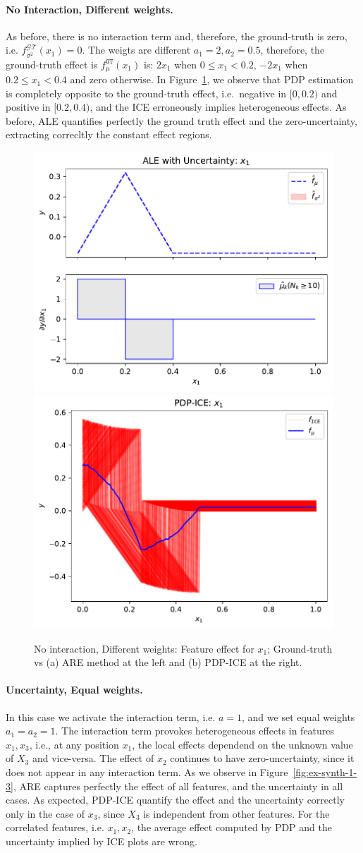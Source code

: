 \documentclass[twoside]{article}
\begin{document}
\paragraph{No Interaction, Different weights.}

As before, there is no interaction term and, therefore, the
ground-truth is zero, i.e.  \(f^{\mathcal{GT}}_{\sigma^2}(x_1) =
0\). The weigts are different \(a_1=2, a_2=0.5\), therefore, the
ground-truth effect is \(f_\mu^{\mathtt{GT}}(x_1)\) is: \(2x_1\) when
\(0 \leq x_1 < 0.2\), \(-2x_1\) when \(0.2 \leq x_1 < 0.4\) and zero
otherwise. In Figure~\ref{fig:ex-synth-1-2}, we observe that PDP
estimation is completely opposite to the ground-truth effect,
i.e.~negative in \([0, 0.2)\) and positive in \([0.2, 0.4)\), and the
ICE erroneously implies heterogeneous effects.  As before, ALE
quantifies perfectly the ground truth effect and the zero-uncertainty,
extracting correcltly the constant effect regions.

\begin{figure}[h]
  \centering
  \includegraphics[width=.23\textwidth]{example_2/dale_feat_0.pdf}
  \includegraphics[width=.23\textwidth]{example_2/pdp_ice_feat_0.pdf}
  \caption{No interaction, Different weights: Feature effect for \(x_1\);
    Ground-truth vs (a) ARE method at the left and (b) PDP-ICE at the
    right.}
  \label{fig:ex-synth-1-2}
\end{figure}

\paragraph{Uncertainty, Equal weights.}

In this case we activate the interaction term, i.e. \(a=1\), and we
set equal weights \(a_1=a_2=1\). The interaction term provokes
heterogeneous effects in features \(x_1, x_3\), i.e., at any position
\(x_1\), the local effects dependend on the unknown value of \(X_3\)
and vice-versa. The effect of \(x_2\) continues to have
zero-uncertainty, since it does not appear in any interaction term. As
we observe in Figure~\ref{fig:ex-synth-1-3}, ARE captures perfectly
the effect of all features, and the uncertainty in all cases. As
expected, PDP-ICE quantify the effect and the uncertainty correctly
only in the case of \(x_3\), since \(X_3\) is independent from other
features. For the correlated features, i.e. \(x_1, x_2\), the average
effect computed by PDP and the uncertainty implied by ICE plots are
wrong.
\end{document}
